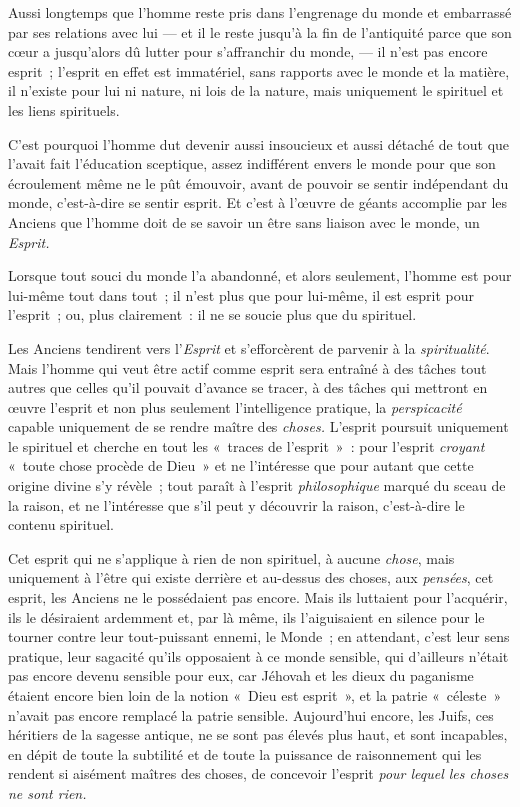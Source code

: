 \documentclass[french,twoside]{book} %
\begin{document}
Aussi longtemps que l’homme reste pris dans l’engrenage du monde et embarrassé par ses relations avec lui — et il le reste jusqu’à la fin de l’antiquité parce que son cœur a jusqu’alors dû lutter pour s’affranchir du monde, — il n’est pas encore esprit ; l’esprit en effet est immatériel, sans rapports avec le monde et la matière, il n’existe pour lui ni nature, ni lois de la nature, mais uniquement le spirituel et les liens spirituels.\par
C’est pourquoi l’homme dut devenir aussi insoucieux et aussi détaché de tout que l’avait fait l’éducation sceptique, assez indifférent envers le monde pour que son écroulement même ne le pût émouvoir, avant de pouvoir se sentir indépendant du monde, c’est-à-dire se sentir esprit. Et c’est à l’œuvre de géants accomplie par les Anciens que l’homme doit de se savoir un être sans liaison avec le monde, un \emph{Esprit.}\par
Lorsque tout souci du monde l’a abandonné, et alors seulement, l’homme est pour lui-même tout dans tout ; il n’est plus que pour lui-même, il est esprit pour l’esprit ; ou, plus clairement : il ne se soucie plus que du spirituel.\par
Les Anciens tendirent vers l’\emph{Esprit} et s’efforcèrent de parvenir à la \emph{spiritualité}. Mais l’homme qui veut être actif comme esprit sera entraîné à des tâches tout autres que celles qu’il pouvait d’avance se tracer, à des tâches qui mettront en œuvre l’esprit et non plus seulement l’intelligence pratique, la \emph{perspicacité} capable uniquement de se rendre maître des \emph{choses.} L’esprit poursuit uniquement le spirituel et cherche en tout les « traces de l’esprit » : pour l’esprit \emph{croyant }« toute chose procède de Dieu » et ne l’intéresse que pour autant que cette origine divine s’y révèle ; tout paraît à l’esprit \emph{philosophique} marqué du sceau de la  raison, et ne l’intéresse que s’il peut y découvrir la raison, c’est-à-dire le contenu spirituel.\par
Cet esprit qui ne s’applique à rien de non spirituel, à aucune \emph{chose}, mais uniquement à l’être qui existe derrière et au-dessus des choses, aux \emph{pensées}, cet esprit, les Anciens ne le possédaient pas encore. Mais ils luttaient pour l’acquérir, ils le désiraient ardemment et, par là même, ils l’aiguisaient en silence pour le tourner contre leur tout-puissant ennemi, le Monde ; en attendant, c’est leur sens pratique, leur sagacité qu’ils opposaient à ce monde sensible, qui d’ailleurs n’était pas encore devenu sensible pour eux, car Jéhovah et les dieux du paganisme étaient encore bien loin de la notion « Dieu est esprit », et la patrie « céleste » n’avait pas encore remplacé la patrie sensible. Aujourd’hui encore, les Juifs, ces héritiers de la sagesse antique, ne se sont pas élevés plus haut, et sont incapables, en dépit de toute la subtilité et de toute la puissance de raisonnement qui les rendent si aisément maîtres des choses, de concevoir l’esprit \emph{pour lequel les choses ne sont rien.}\par
\end{document}
